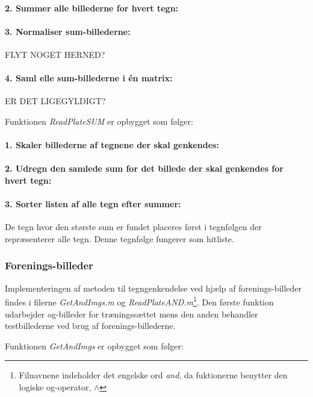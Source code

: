 \paragraph{2. Summer alle billederne for hvert tegn:}

\paragraph{3. Normaliser sum-billederne:} FLYT NOGET HERNED?

\paragraph{4. Saml elle sum-billederne i én matrix:} ER DET LIGEGYLDIGT?

Funktionen \textit{ReadPlateSUM} er opbygget som følger:

\paragraph{1. Skaler billederne af tegnene der skal genkendes:}

\paragraph{2. Udregn den samlede sum for det billede der skal genkendes for hvert tegn:}

\paragraph{3. Sorter listen af alle tegn efter summer:} De tegn hvor den største sum er fundet placeres først i tegnfølgen der repræsenterer alle tegn. Denne tegnfølge fungerer som hitliste.

\subsubsection{Forenings-billeder}

Implementeringen af metoden til tegngenkendelse ved hjælp af forenings-billeder findes i filerne \textit{GetAndImgs.m} og \textit{ReadPlateAND.m}\footnote{Filnavnene indeholder det engelske ord \textit{and}, da fuktionerne benytter den logiske og-operator, $\wedge$}. Den første funktion udarbejder og-billeder for træningssættet mens den anden behandler testbillederne ved brug af forenings-billederne.

Funktionen \textit{GetAndImgs} er opbygget som følger:

